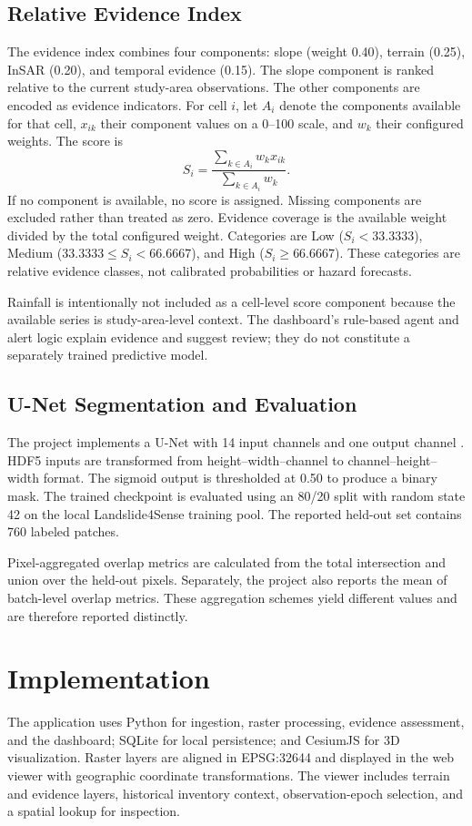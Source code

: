 \documentclass[conference]{IEEEtran}
\begin{document}
\subsection{Relative Evidence Index}
The evidence index combines four components: slope (weight 0.40), terrain
(0.25), InSAR (0.20), and temporal evidence (0.15). The slope component is
ranked relative to the current study-area observations. The other components
are encoded as evidence indicators. For cell $i$, let $A_i$ denote the
components available for that cell, $x_{ik}$ their component values on a
0--100 scale, and $w_k$ their configured weights. The score is
\begin{equation}
S_i =
\frac{\sum_{k \in A_i} w_k x_{ik}}
     {\sum_{k \in A_i} w_k}.
\label{eq:score}
\end{equation}
If no component is available, no score is assigned. Missing components are
excluded rather than treated as zero. Evidence coverage is the available
weight divided by the total configured weight. Categories are Low
($S_i < 33.3333$), Medium ($33.3333 \leq S_i < 66.6667$), and High
($S_i \geq 66.6667$). These categories are relative evidence classes, not
calibrated probabilities or hazard forecasts.

Rainfall is intentionally not included as a cell-level score component
because the available series is study-area-level context. The dashboard's
rule-based agent and alert logic explain evidence and suggest review; they do
not constitute a separately trained predictive model.

\subsection{U-Net Segmentation and Evaluation}
The project implements a U-Net with 14 input channels and one output channel
\cite{unet}. HDF5 inputs are transformed from height--width--channel to
channel--height--width format. The sigmoid output is thresholded at 0.50 to
produce a binary mask. The trained checkpoint is evaluated using an 80/20
split with random state 42 on the local Landslide4Sense training pool. The
reported held-out set contains 760 labeled patches.

Pixel-aggregated overlap metrics are calculated from the total intersection
and union over the held-out pixels. Separately, the project also reports the
mean of batch-level overlap metrics. These aggregation schemes yield
different values and are therefore reported distinctly.

\section{Implementation}
The application uses Python for ingestion, raster processing, evidence
assessment, and the dashboard; SQLite for local persistence; and CesiumJS for
3D visualization. Raster layers are aligned in EPSG:32644 and displayed in the
web viewer with geographic coordinate transformations. The viewer includes
terrain and evidence layers, historical inventory context, observation-epoch
selection, and a spatial lookup for inspection.
\end{document}

